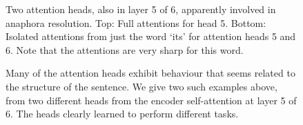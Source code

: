 \documentclass[11pt,a4paper]{article}
\begin{document}
\begin{figure}[h]
\caption{Two attention heads, also in layer 5 of 6, apparently involved in anaphora resolution. Top: Full attentions for head 5. Bottom: Isolated attentions from just the word `its' for attention heads 5 and 6. Note that the attentions are very sharp for this word.}
\end{figure}

\begin{figure}[h]
\end{figure}

\begin{figure}[h]
\caption{Many of the attention heads exhibit behaviour that seems related to the structure of the sentence. We give two such examples above, from two different heads from the encoder self-attention at layer 5 of 6. The heads clearly learned to perform different tasks.}
\end{figure}

\begin{figure}[h]
\end{figure}
\end{document}

